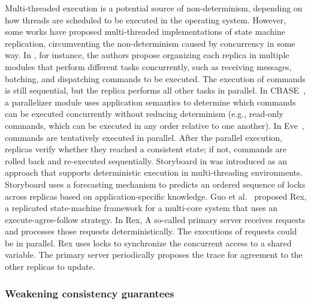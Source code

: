Multi-threaded execution is a potential source of non-determinism, depending on
how threads are scheduled to be executed in the operating system. However, some
works have proposed multi-threaded implementations of state machine replication,
circumventing the non-determinism caused by concurrency in some way. In
\cite{santos2013htsmr}, for instance, the authors propose organizing each
replica in multiple modules that perform different tasks concurrently, such as
receiving messages, batching, and dispatching commands to be executed. The
execution of commands is still sequential, but the replica performs all other
tasks in parallel. In CBASE~\cite{Kotla:2004ep}, a parallelizer module uses
application semantics to determine which commands can be executed concurrently
without reducing determinism (e.g., read-only commands, which can be executed in
any order relative to one another). In Eve~\cite{Kapritsos:2012um}, commands are
tentatively executed in parallel. After the parallel execution, replicas verify
whether they reached a consistent state; if not, commands are rolled back and
re-executed sequentially. Storyboard in \cite{Kapitza:2010Storyboard} was
introduced as an approach that supports deterministic execution in
multi-threading environments. Storyboard uses a forecasting mechanism to
predicts an ordered sequence of locks across replicas based on
application-specific knowledge. Guo et al.~\cite{guo2014rex} proposed Rex, a
replicated state-machine framework for a multi-core system that uses an
execute-agree-follow strategy. In Rex, A so-called primary server receives
requests and processes those requests deterministically. The executions of
requests could be in parallel. Rex uses locks to synchronize the concurrent
access to a shared variable. The primary server periodically proposes the trace
for agreement to the other replicas to update.

\subsubsection{Weakening consistency guarantees}

